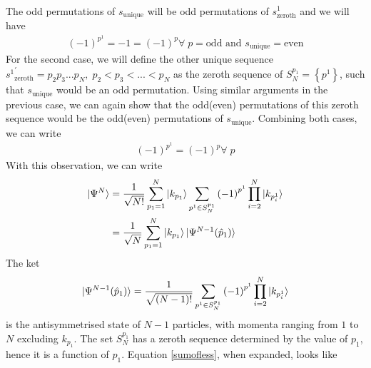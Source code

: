 \documentclass[12pt,twoside]{article}
\numberwithin{equation}{section}
\begin{document}
{\begin{equation}
\begin{aligned}
\end{aligned}\end{equation}
The odd permutations of \(s_\text{unique}\) will be odd permutations of \(s^1_\text{zeroth}\) and we will have
\begin{equation}\begin{aligned}
	\left( -1 \right)^{p^1} = -1 = \left( -1 \right)^{p} \forall\;p=\text{odd} \text{ and }s_\text{unique}=\text{even}
\end{aligned}\end{equation}
\pb For the second case, we will define the other unique sequence \({s^1}^\prime_\text{zeroth}=p_2 p_3 ... p_N, \;p_2<p_3<...<p_N\) as the zeroth sequence of \(S_N^{p_1} = \left\{ p^1 \right\} \), such that \(s_\text{unique}\) would be an odd permutation. Using similar arguments in the previous case, we can again show that the odd(even) permutations of this zeroth sequence would be the odd(even) permutations of \(s_\text{unique}\). Combining both cases, we can write
\begin{equation}\begin{aligned}
	\left( -1 \right)^{p^1} = \left( -1 \right)^{p} \forall\;p
\end{aligned}\end{equation}
\pb With this observation, we can write
\begin{equation}\begin{aligned}
	\label{sumofless}
	\ket{\Psi^N} &=\frac{1}{\sqrt{N!}}\sum_{p_1=1}^N \ket{k_{p_1}} \sum_{p^1 \in S_N^{p_1}} \left( -1 \right)^{p^1} \prod_{i=2}^N \ket{k_{p^1_i}}\\
		     &=\frac{1}{\sqrt{N}}\sum_{p_1=1}^N \ket{k_{p_1}} \ket{\Psi^{N-1}(\hat p_1)}
\end{aligned}\end{equation}
The ket 
\begin{equation}\begin{aligned}
	\ket{\Psi^{N-1}(\hat p_1)} = \frac{1}{\sqrt{(N-1)!}}\sum_{p^1 \in S_N^{p_1}} \left( -1 \right)^{p^1} \prod_{i=2}^N \ket{k_{p^1_i}}
\end{aligned}\end{equation}
is the antisymmetrised state of \(N-1\) particles, with momenta ranging from \(1\) to \(N\) excluding \(k_{p_1}\). The set \(S_N^{p_1}\) has a zeroth sequence determined by the value of \(p_1\), hence it is a function of \(p_1\). 
\pb Equation \ref{sumofless}, when expanded, looks like
\begin{equation}\begin{aligned}

\end{aligned}
\end{equation}}
\end{document}
